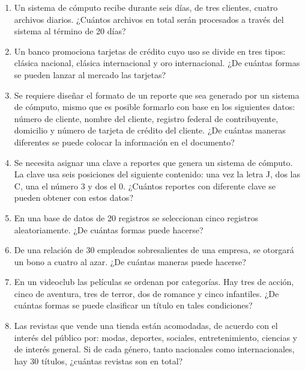 \begin{Ejer}
\begin{enumerate}

\item Un sistema de c\'omputo recibe durante seis d\'ias, de tres clientes, cuatro archivos diarios. ¿Cu\'antos archivos en total ser\'an procesados a trav\'es del sistema al t\'ermino de 20 d\'ias?

\item Un banco promociona tarjetas de cr\'edito cuyo uso se divide en tres tipos: cl\'asica nacional, cl\'asica internacional y oro internacional. ¿De cu\'antas formas se pueden lanzar al mercado las tarjetas?

\item Se requiere dise\~nar el formato de un reporte que sea generado por un sistema de c\'omputo, mismo que es posible formarlo con base en los siguientes datos: n\'umero de cliente, nombre del cliente, registro federal de contribuyente, domicilio y n\'umero de tarjeta de cr\'edito del cliente. ¿De cu\'antas maneras diferentes se puede colocar la informaci\'on en el documento?

\item Se necesita asignar una clave a reportes que genera un sistema de c\'omputo. La clave usa seis posiciones del siguiente contenido: una vez la letra J, dos las C, una el n\'umero 3 y dos el 0. ¿Cu\'antos reportes con diferente clave se pueden obtener con estos datos?

\item En una base de datos de 20 registros se seleccionan cinco registros aleatoriamente. ¿De cu\'antas formas puede hacerse?

\item De una relaci\'on de 30 empleados sobresalientes de una empresa, se otorgar\'a un bono a cuatro al azar. ¿De cu\'antas maneras puede hacerse?

\item En un videoclub las pel\'iculas se ordenan por categor\'ias. Hay tres de acci\'on, cinco de aventura, tres de terror, dos de romance y cinco infantiles. ¿De cu\'antas formas se puede clasificar un t\'itulo en tales condiciones?

\item Las revistas que vende una tienda est\'an acomodadas, de acuerdo con el inter\'es del p\'ublico por: modas, deportes, sociales, entretenimiento, ciencias y de inter\'es general. Si de cada g\'enero, tanto nacionales como internacionales, hay 30 t\'itulos, ¿cu\'antas revistas son en total?


\end{enumerate}
\end{Ejer}
